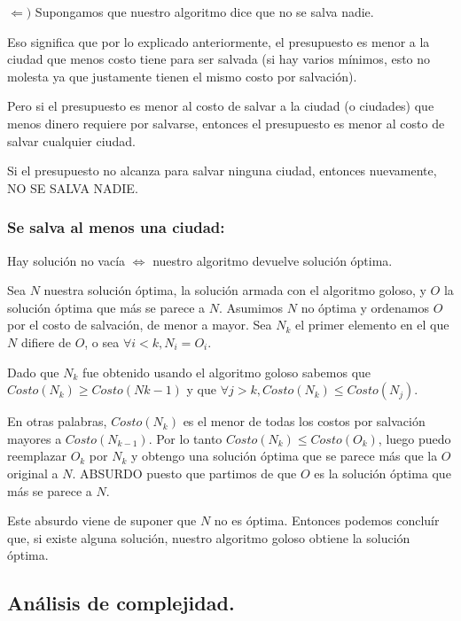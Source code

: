 $\Longleftarrow )$ Supongamos que nuestro algoritmo dice que no se salva nadie.

Eso significa que por lo explicado anteriormente, el presupuesto es menor a la ciudad que menos costo tiene para ser salvada (si hay varios mínimos, esto no molesta ya que justamente tienen el mismo costo por salvación).

Pero si el presupuesto es menor al costo de salvar a la ciudad (o ciudades) que menos dinero requiere por salvarse, entonces el presupuesto es menor al costo de salvar cualquier ciudad.

Si el presupuesto no alcanza para salvar ninguna ciudad, entonces nuevamente, NO SE SALVA NADIE.

\subsubsection{Se salva al menos una ciudad:}

Hay solución no vacía $\Longleftrightarrow$ nuestro algoritmo devuelve solución óptima.

Sea $N$ nuestra solución óptima, la solución armada con el algoritmo goloso, y $O$ la solución óptima que más se parece a $N$. Asumimos $N$ no óptima y ordenamos $O$ por el costo de salvación, de menor a mayor.
Sea $N_{k}$ el primer elemento en el que $N$ difiere de $O$, o sea $\forall i<k , N_{i}=O_{i}$.

Dado que $N_{k}$ fue obtenido usando el algoritmo goloso sabemos que $Costo(N_{k}) \geq Costo(N{k-1})$ y que $\forall j>k, Costo(N_{k}) \leq Costo(N_{j})$.

En otras palabras, $Costo(N_{k})$ es el menor de todas los costos por salvación mayores a $Costo(N_{k-1})$. Por lo tanto $Costo(N_{k}) \leq Costo(O_{k})$, luego puedo reemplazar $O_{k}$ por $N_{k}$ y obtengo una solución óptima que se parece más que la $O$ original a $N$. ABSURDO puesto que partimos de que $O$ es la solución óptima que más se parece a $N$.

Este absurdo viene de suponer que $N$ no es óptima.  Entonces podemos concluír que, si existe alguna solución, nuestro algoritmo goloso obtiene la solución óptima.

\vspace*{0.6cm}

\subsection{Análisis de complejidad.}

